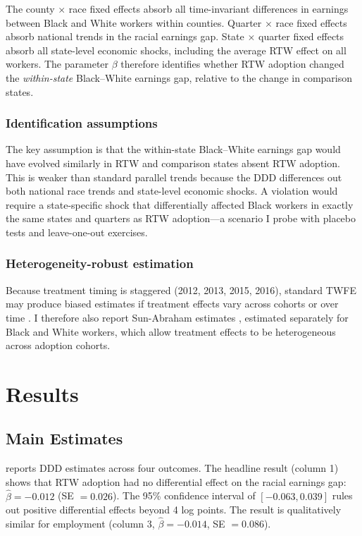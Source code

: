 \documentclass[12pt]{article}
\begin{document}
The county $\times$ race fixed effects absorb all time-invariant differences in earnings between Black and White workers within counties. Quarter $\times$ race fixed effects absorb national trends in the racial earnings gap. State $\times$ quarter fixed effects absorb all state-level economic shocks, including the average RTW effect on all workers. The parameter $\beta$ therefore identifies whether RTW adoption changed the \textit{within-state} Black--White earnings gap, relative to the change in comparison states.

\subsubsection*{Identification assumptions} The key assumption is that the within-state Black--White earnings gap would have evolved similarly in RTW and comparison states absent RTW adoption. This is weaker than standard parallel trends because the DDD differences out both national race trends and state-level economic shocks. A violation would require a state-specific shock that differentially affected Black workers in exactly the same states and quarters as RTW adoption---a scenario I probe with placebo tests and leave-one-out exercises.

\subsubsection*{Heterogeneity-robust estimation} Because treatment timing is staggered (2012, 2013, 2015, 2016), standard TWFE may produce biased estimates if treatment effects vary across cohorts or over time \citep{goodman2021difference}. I therefore also report Sun-Abraham estimates \citep{sun2021estimating}, estimated separately for Black and White workers, which allow treatment effects to be heterogeneous across adoption cohorts.


\section{Results}
\label{sec:results}

\subsection{Main Estimates}

 reports DDD estimates across four outcomes. The headline result (column 1) shows that RTW adoption had no differential effect on the racial earnings gap: $\hat{\beta} = -0.012$ (SE $= 0.026$). The 95\% confidence interval of $[-0.063, 0.039]$ rules out positive differential effects beyond 4 log points. The result is qualitatively similar for employment (column 3, $\hat{\beta} = -0.014$, SE $= 0.086$).
\end{document}

